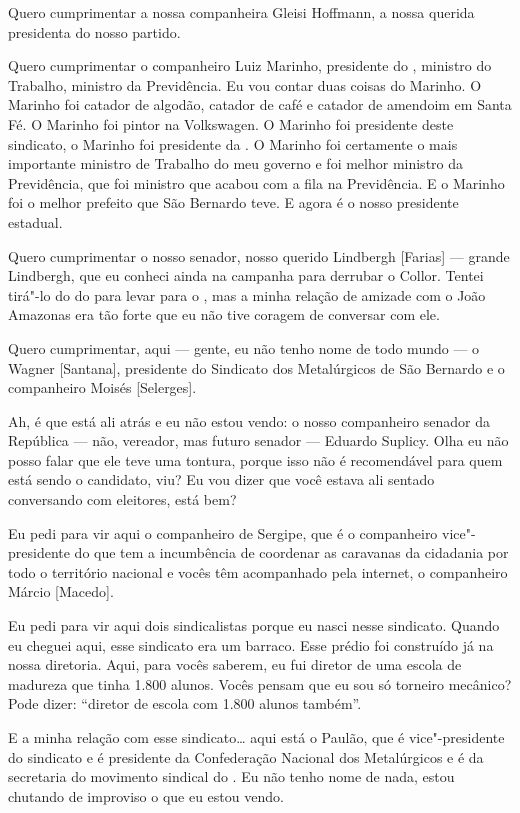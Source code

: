 Quero cumprimentar a nossa companheira Gleisi Hoffmann, a nossa
querida presidenta do nosso partido.

Quero cumprimentar o companheiro Luiz Marinho, presidente do ,
ministro do Trabalho, ministro da Previdência. Eu vou contar duas coisas
do Marinho. O Marinho foi catador de algodão, catador de café e catador
de amendoim em Santa Fé. O Marinho foi pintor na Volkswagen. O Marinho
foi presidente deste sindicato, o Marinho foi presidente da . O
Marinho foi certamente o mais importante ministro de Trabalho do meu
governo e foi melhor ministro da Previdência, que foi ministro que
acabou com a fila na Previdência. E o Marinho foi o melhor prefeito que
São Bernardo teve. E agora é o nosso presidente estadual.

Quero cumprimentar o nosso senador, nosso querido Lindbergh
[Farias] --- grande Lindbergh, que eu conheci ainda na campanha
para derrubar o Collor. Tentei tirá"-lo do do para levar para o ,
mas a minha relação de amizade com o João Amazonas era tão forte que eu
não tive coragem de conversar com ele.

Quero cumprimentar, aqui --- gente, eu não tenho nome de todo
mundo --- o Wagner [Santana], presidente do
Sindicato dos Metalúrgicos de São Bernardo e o companheiro Moisés
[Selerges].

Ah, é que está ali atrás e eu não estou vendo: o nosso companheiro
senador da República --- não, vereador, mas futuro senador --- Eduardo
Suplicy. Olha eu não posso falar que ele teve uma tontura, porque isso
não é recomendável para quem está sendo o candidato, viu? Eu vou dizer
que você estava ali sentado conversando com eleitores, está bem?

Eu pedi para vir aqui o companheiro de Sergipe, que é o
companheiro vice"-presidente do  que tem a incumbência de coordenar as
caravanas da cidadania por todo o território nacional e vocês têm
acompanhado pela internet, o companheiro Márcio [Macedo].

Eu pedi para vir aqui dois sindicalistas porque eu nasci nesse
sindicato. Quando eu cheguei aqui, esse sindicato era um barraco. Esse
prédio foi construído já na nossa diretoria. Aqui, para vocês saberem,
eu fui diretor de uma escola de madureza que tinha 1.800 alunos. Vocês
pensam que eu sou só torneiro mecânico? Pode dizer: ``diretor de escola
com 1.800 alunos também''.

E a minha relação com esse sindicato\ldots{} aqui está o Paulão, que é
vice"-presidente do sindicato e é presidente da Confederação Nacional dos
Metalúrgicos e é da secretaria do movimento sindical do . Eu não tenho
nome de nada, estou chutando de improviso o que eu estou vendo.

